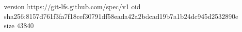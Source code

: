 version https://git-lfs.github.com/spec/v1
oid sha256:8157d761f3fa7f18cef30791df58eada42a2bdcad19b7a1b24dc945d2532890e
size 43840
